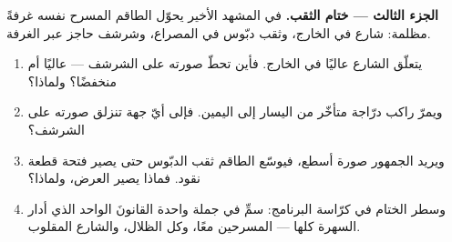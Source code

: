 \begin{problem}
\medskip\noindent\textbf{الجزء الثالث --- ختام الثقب.}
في المشهد الأخير يحوّل الطاقم المسرح نفسه غرفةً مظلمة: 
شارع في الخارج، وثقب دبّوس في المصراع، وشرشف حاجز عبر الغرفة.
\begin{enumerate}[resume]
  \item يتعلّق  الشارع عاليًا في الخارج. فأين تحطّ صورته
        على الشرشف --- عاليًا أم منخفضًا؟ ولماذا؟
  \item ويمرّ راكب درّاجة متأخّر من اليسار إلى اليمين. فإلى
        أيّ جهة تنزلق صورته على الشرشف؟
  \item ويريد الجمهور صورة أسطع، فيوسّع الطاقم ثقب الدبّوس حتى
        يصير فتحة  قطعة نقود. فماذا يصير العرض، ولماذا؟
  \item وسطر الختام في كرّاسة البرنامج: سمِّ في جملة واحدة
        القانونَ الواحد الذي أدار السهرة كلها --- المسرحين معًا،
        وكل الظلال، والشارع المقلوب.
\end{enumerate}
\end{problem}
